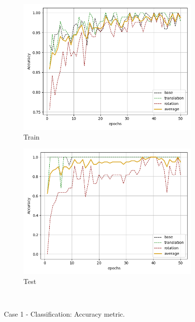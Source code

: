 \begin{figure}[H]
    \begin{subfigure}{.48\linewidth}
    \centering
    \includegraphics[scale=0.45]{Img/cls_nonoise_train_acc.png}
    \caption{Train}
    \end{subfigure}
    \begin{subfigure}{.48\linewidth}
    \centering
    \includegraphics[scale=0.45]{Img/cls_nonoise_test_acc.png}
    \caption{Test}
    \end{subfigure}\\
    \caption{Case 1 - Classification: Accuracy metric. }
\end{figure}
